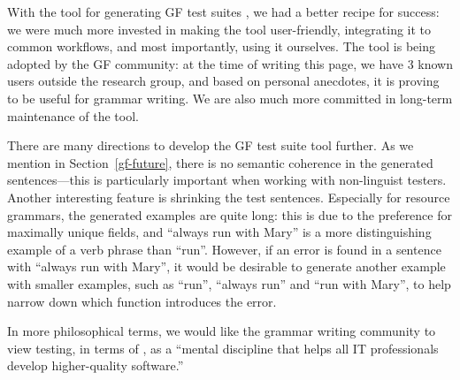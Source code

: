 With the tool for generating GF test suites
\cite{listenmaa_claessen2018}, we had a better recipe for success: we
were much more invested in making the tool user-friendly, integrating
it to common workflows, and most importantly, using it ourselves. The
tool is being adopted by the GF community: at the time of writing this
page, we have 3 known users outside the research group, and based on
personal anecdotes, it is proving to be useful for grammar writing. We
are also much more committed in long-term maintenance of the tool.

There are many directions to develop the GF test suite tool further.
As we mention in Section~\ref{gf-future}, there is no semantic
coherence in the generated sentences---this is particularly important
when working with non-linguist testers.  Another interesting feature
is shrinking the test sentences. Especially for resource grammars, the
generated examples are quite long: this is due to the preference for
maximally unique fields, and ``always run with Mary'' is a more
distinguishing example of a verb phrase than ``run''. However, if an
error is found in a sentence with ``always run with Mary'', it would
be desirable to generate another example with smaller examples, such
as ``run'', ``always run'' and ``run with Mary'', to help narrow down
which function introduces the error.

In more philosophical terms, we would like the grammar writing
community to view testing, in terms of \citet{beizer2003software}, as a
``mental discipline that helps all IT professionals develop
higher-quality software.'' 

